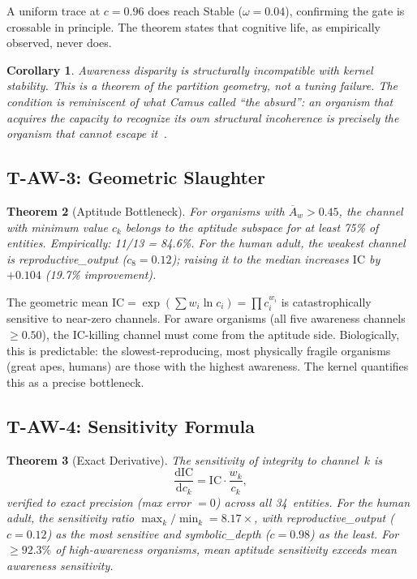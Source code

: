 \documentclass[
  aps,
  prd,
  twocolumn,
  superscriptaddress,
  nofootinbib,
  floatfix
]{revtex4-2}
\newtheorem{theorem}{Theorem}
\newtheorem{corollary}[theorem]{Corollary}
\newcommand{\dd}{\mathrm{d}}
\newcommand{\beq}{\begin{equation}}
\newcommand{\eeq}{\end{equation}}
\newcommand{\IC}{\mathrm{IC}}
\newcommand{\Aw}{\overline{A}_{\!w}}
\begin{document}
A uniform trace at $c = 0.96$ does reach Stable
($\omega = 0.04$), confirming the gate is crossable in
principle.  The theorem states that cognitive life, as
empirically observed, never does.

\begin{corollary}
Awareness disparity is structurally incompatible with kernel
stability.  This is a theorem of the partition geometry,
not a tuning failure.  The condition is reminiscent of what
Camus called ``the absurd'': an organism that acquires the
capacity to recognize its own structural incoherence is
precisely the organism that cannot escape
it~\cite{camus1942sisyphus}.
\end{corollary}

\subsection{T-AW-3: Geometric Slaughter}

\begin{theorem}[Aptitude Bottleneck]\label{thm:TAW3}
For organisms with $\Aw > 0.45$, the channel with minimum
value $c_k$ belongs to the aptitude subspace for at least
75\% of entities.  Empirically: 11/13 = 84.6\%.  For the
human adult, the weakest channel is \textup{reproductive\_output}
($c_8 = 0.12$); raising it to the median
increases $\IC$ by $+0.104$ (19.7\% improvement).
\end{theorem}

The geometric mean $\IC = \exp(\sum w_i \ln c_i) =
\prod c_i^{w_i}$ is catastrophically sensitive to near-zero
channels.  For aware organisms (all five awareness channels
$\geq 0.50$), the $\IC$-killing channel must come from the
aptitude side.  Biologically, this is predictable: the
slowest-reproducing, most physically fragile organisms
(great apes, humans) are those with the highest awareness.
The kernel quantifies this as a precise bottleneck.

\subsection{T-AW-4: Sensitivity Formula}

\begin{theorem}[Exact Derivative]\label{thm:TAW4}
The sensitivity of integrity to channel~$k$ is
\beq\label{eq:sensitivity}
  \frac{\dd\IC}{\dd c_k} = \IC \cdot \frac{w_k}{c_k},
\eeq
verified to exact precision (max error $= 0$) across all
34~entities.  For the human adult, the sensitivity ratio
$\max_k / \min_k = 8.17\!\times$, with
\textup{reproductive\_output} ($c = 0.12$) as the most
sensitive and \textup{symbolic\_depth} ($c = 0.98$) as
the least.  For $\geq 92.3\%$ of high-awareness organisms,
mean aptitude sensitivity exceeds mean awareness sensitivity.
\end{theorem}
\end{document}
